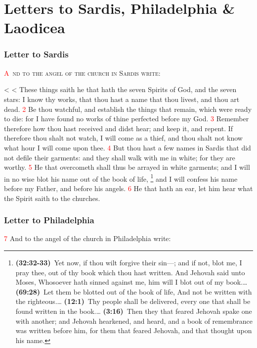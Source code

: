 \documentclass[12pt,twoside]{memoir}
\makeatletter
\newcommand{\cbibleref}[3]{\textbf{\ibibleverse{#1}(#2)}\ {#3}}
\newcommand{\vnum}[1]{\textcolor{red}{\normalsize{#1}}}
\def\zz{%
\ifnum\prevgraf<\c@L@lines
\zzc\z@
\loop
\ifnum\zzc<\prevgraf
\advance\zzc\@ne
\afterassignment\zzda\count@\L@parshape\relax
\repeat
\parshape\L@parshape
\fi}
\def\zzda{\afterassignment\zzdb\dimen@}
\def\zzdb{\afterassignment\zzdef\dimen@}
\def\zzdef#1\relax{\edef\L@parshape{\the\numexpr\count@-1\relax\space #1}}
\makeatother
\begin{document}
\chapter{Letters to Sardis, Philadelphia \& Laodicea}
\subsection*{Letter to Sardis}
\lettrine[lines=3]{\textcolor{red}{A}}{\ nd to the angel of the church in Sardis write}:

\zz These things saith he that hath the seven Spirits of God, and the seven stars: I know thy works, that thou hast a name that thou livest, and thou art dead. %
\vnum{2} Be thou watchful, and establish the things that remain, which were ready to die: for I have found no works of thine perfected before my God. %
\vnum{3} Remember therefore how thou hast received and didst hear; and keep it, and repent. If therefore thou shalt not watch, I will come as a thief, and thou shalt not know what hour I will come upon thee. %
\vnum{4} But thou hast a few names in Sardis that did not defile their garments: and they shall walk with me in white; for they are worthy. %
\vnum{5} He that overcometh shall thus be arrayed in white garments; and I will in no wise blot his name out of the book of life,%
	\footnote{\cbibleref{Exodus}{32:32-33}{Yet now, if thou wilt forgive their sin—; and if not, blot me, I pray thee, out of thy book which thou hast written. And Jehovah said unto Moses, Whosoever hath sinned against me, him will I blot out of my book.}\ldots%
			\cbibleref{Psalms}{69:28}{Let them be blotted out of the book of life, And not be written with the righteous.}\ldots%
			\cbibleref{Daniel}{12:1}{Thy people shall be delivered, every one that shall be found written in the book.}\ldots%
			\cbibleref{Malachi}{3:16}{Then they that feared Jehovah spake one with another; and Jehovah hearkened, and heard, and a book of remembrance was written before him, for them that feared Jehovah, and that thought upon his name.}}
 and I will confess his name before my Father, and before his angels. %
\vnum{6} He that hath an ear, let him hear what the Spirit saith to the churches.
\subsection*{Letter to Philadelphia}
\vnum{7} And to the angel of the church in Philadelphia write:
\end{document}
